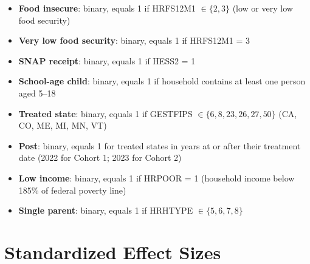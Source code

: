 \documentclass[12pt]{article}
\begin{document}
\begin{itemize}[nosep]
\item \textbf{Food insecure}: binary, equals 1 if HRFS12M1 $\in \{2, 3\}$ (low or very low food security)
\item \textbf{Very low food security}: binary, equals 1 if HRFS12M1 = 3
\item \textbf{SNAP receipt}: binary, equals 1 if HESS2 = 1
\item \textbf{School-age child}: binary, equals 1 if household contains at least one person aged 5--18
\item \textbf{Treated state}: binary, equals 1 if GESTFIPS $\in \{6, 8, 23, 26, 27, 50\}$ (CA, CO, ME, MI, MN, VT)
\item \textbf{Post}: binary, equals 1 for treated states in years at or after their treatment date (2022 for Cohort 1; 2023 for Cohort 2)
\item \textbf{Low income}: binary, equals 1 if HRPOOR = 1 (household income below 185\% of federal poverty line)
\item \textbf{Single parent}: binary, equals 1 if HRHTYPE $\in \{5, 6, 7, 8\}$
\end{itemize}


\section{Standardized Effect Sizes}
\label{sec:sde}


\end{document}
